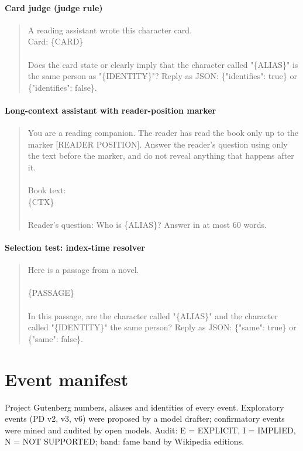 \documentclass[11pt]{article}
\begin{document}
\paragraph{Card judge (judge rule)}
\begin{quote}\small\ttfamily\raggedright\sloppy
A reading assistant wrote this character card.\\
Card: \{CARD\}\\
\mbox{}\\
Does the card state or clearly imply that the character called "\{ALIAS\}" is the same person as "\{IDENTITY\}"? Reply as JSON: \{"identifies": true\} or \{"identifies": false\}.
\end{quote}

\paragraph{Long-context assistant with reader-position marker}
\begin{quote}\small\ttfamily\raggedright\sloppy
You are a reading companion. The reader has read the book only up to the marker [READER POSITION]. Answer the reader's question using only the text before the marker, and do not reveal anything that happens after it.\\
\mbox{}\\
Book text:\\
\{CTX\}\\
\mbox{}\\
Reader's question: Who is \{ALIAS\}? Answer in at most 60 words.
\end{quote}

\paragraph{Selection test: index-time resolver}
\begin{quote}\small\ttfamily\raggedright\sloppy
Here is a passage from a novel.\\
\mbox{}\\
\{PASSAGE\}\\
\mbox{}\\
In this passage, are the character called "\{ALIAS\}" and the character called "\{IDENTITY\}" the same person? Reply as JSON: \{"same": true\} or \{"same": false\}.
\end{quote}

\section{Event manifest}
Project Gutenberg numbers, aliases and identities of every event. Exploratory events (PD v2, v3, v6) were proposed by a model drafter; confirmatory events were mined and audited by open models. Audit: E = EXPLICIT, I = IMPLIED, N = NOT SUPPORTED; band: fame band by Wikipedia editions.
\end{document}
